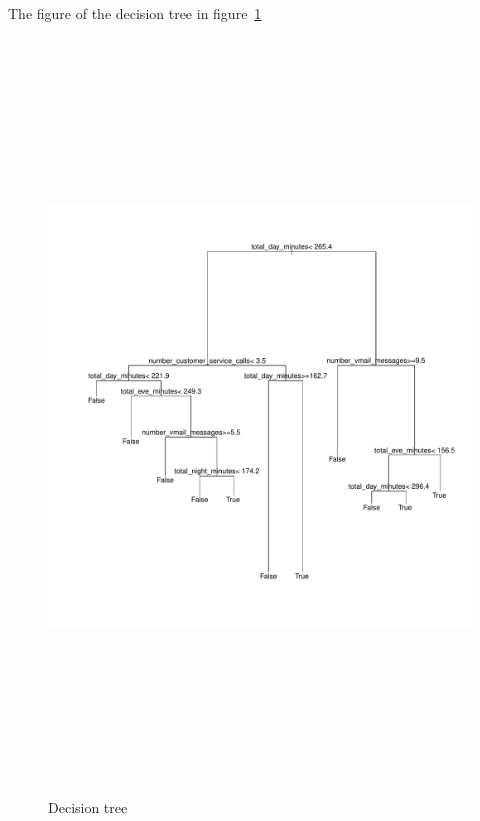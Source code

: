 	The figure of the decision tree in figure~\ref{dt-fig}
		\begin{figure}
			\caption{Decision tree}
			\label{dt-fig}
			\hspace*{-3cm}
			\includegraphics[width=18cm,height=20cm]{progress_presentaion/ppt_figures/churnDecisionTree}
		\end{figure}

\newpage
